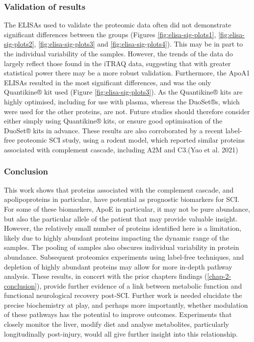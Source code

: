 \documentclass[9pt,lineno]{elife}
\begin{document}
\begin{landscape}
\begin{landscape}
\hypertarget{validation-of-results}{%
\subsubsection{Validation of results}\label{validation-of-results}}

The ELISAs used to validate the proteomic data often did not demonstrate significant differences between the groups (Figures \ref{fig:elisa-sig-plots1}, \ref{fig:elisa-sig-plots2}, \ref{fig:elisa-sig-plots3} and \ref{fig:elisa-sig-plots4}).
This may be in part to the individual variability of the samples.
However, the trends of the data do largely reflect those found in the iTRAQ data, suggesting that with greater statistical power there may be a more robust validation.
Furthermore, the ApoA1 ELISAs resulted in the most significant differences, and was the only Quantikine® kit used (Figure \ref{fig:elisa-sig-plots3}).
As the Quantikine® kits are highly optimised, including for use with plasma, whereas the DuoSet®s, which were used for the other proteins, are not.
Future studies should therefore consider either simply using Quantikine® kits, or ensure good optimisation of the DuoSet® kits in advance.
These results are also corroborated by a recent label-free proteomic SCI study, using a rodent model, which reported similar proteins associated with complement cascade, including A2M and C3.(Yao et al. 2021)

\hypertarget{chap-3-conc}{%
\subsubsection{Conclusion}\label{chap-3-conc}}

This work shows that proteins associated with the complement cascade, and apolipoproteins in particular, have potential as prognostic biomarkers for SCI.
For some of these biomarkers, ApoE in particular, it may not be pure abundance, but also the particular allele of the patient that may provide valuable insight.
However, the relatively small number of proteins identified here is a limitation, likely due to highly abundant proteins impacting the dynamic range of the samples.
The pooling of samples also obscures individual variability in protein abundance.
Subsequent proteomics experiments using label-free techniques, and depletion of highly abundant proteins may allow for more in-depth pathway analysis.
These results, in concert with the prior chapters findings (\ref{chap-2-conclusion}), provide further evidence of a link between metabolic function and functional neurological recovery post-SCI.
Further work is needed elucidate the precise biochemistry at play, and perhaps more importantly, whether modulation of these pathways has the potential to improve outcomes.
Experiments that closely monitor the liver, modify diet and analyse metabolites, particularly longitudinally post-injury, would all give further insight into this relationship.


\end{landscape}
\end{landscape}
\end{document}

